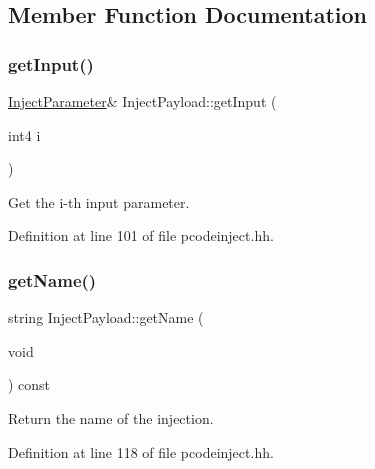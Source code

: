 \subsection{Member Function Documentation}
\mbox{\label{class_inject_payload_a1ad1b32858dcd08f0dd006ec000ace9d}} 
\subsubsection{\texorpdfstring{getInput()}{getInput()}}
{\footnotesize\ttfamily \mbox{\hyperlink{class_inject_parameter}{Inject\+Parameter}}\& Inject\+Payload\+::get\+Input (\begin{DoxyParamCaption}\item[{int4}]{i }\end{DoxyParamCaption})\hspace{0.3cm}{\ttfamily [inline]}}



Get the i-\/th input parameter. 



Definition at line 101 of file pcodeinject.\+hh.

\mbox{\label{class_inject_payload_a79f43ab6aabb0ffc2800d500a975ff19}} 
\subsubsection{\texorpdfstring{getName()}{getName()}}
{\footnotesize\ttfamily string Inject\+Payload\+::get\+Name (\begin{DoxyParamCaption}\item[{void}]{ }\end{DoxyParamCaption}) const\hspace{0.3cm}{\ttfamily [inline]}}



Return the name of the injection. 



Definition at line 118 of file pcodeinject.\+hh.

\mbox{\label{class_inject_payload_a4d125937d17ce0d4016431b1b3dc5558}} 
